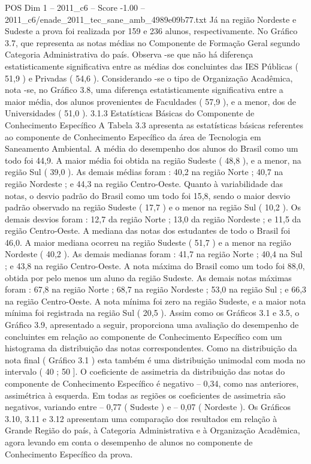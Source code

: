 \begin{textsample}{POS Dim 1 – 2011\_c6 – Score -1.00 – 2011\_c6/enade\_2011\_tec\_sane\_amb\_4989e09b77.txt}
Já na região Nordeste e Sudeste a prova foi realizada por 159 e 236 alunos, respectivamente.
No Gráfico 3.7, que representa as notas médias no Componente de Formação Geral segundo Categoria Administrativa do país.
Observa -se que não há diferença estatisticamente significativa entre as médias dos concluintes das IES Públicas ( 51,9 ) e Privadas ( 54,6 ).
Considerando -se o tipo de Organização Acadêmica, nota -se, no Gráfico 3.8, uma diferença estatisticamente significativa entre a maior média, dos alunos provenientes de Faculdades ( 57,9 ), e a menor, dos de Universidades ( 51,0 ). 3.1.3 Estatísticas Básicas do Componente de Conhecimento Específico A Tabela 3.3 apresenta as estatísticas básicas referentes ao componente de Conhecimento Específico da área de Tecnologia em Saneamento Ambiental.
A média do desempenho dos alunos do Brasil como um todo foi 44,9.
A maior média foi obtida na região Sudeste ( 48,8 ), e a menor, na região Sul ( 39,0 ).
As demais médias foram : 40,2 na região Norte ; 40,7 na região Nordeste ; e 44,3 na região Centro-Oeste.
Quanto à variabilidade das notas, o desvio padrão do Brasil como um todo foi 15,8, sendo o maior desvio padrão observado na região Sudeste ( 17,7 ) e o menor na região Sul ( 10,2 ).
Os demais desvios foram : 12,7 da região Norte ; 13,0 da região Nordeste ; e 11,5 da região Centro-Oeste.
A mediana das notas dos estudantes de todo o Brasil foi 46,0.
A maior mediana ocorreu na região Sudeste ( 51,7 ) e a menor na região Nordeste ( 40,2 ).
As demais medianas foram : 41,7 na região Norte ; 40,4 na Sul ; e 43,8 na região Centro-Oeste.
A nota máxima do Brasil como um todo foi 88,0, obtida por pelo menos um aluno da região Sudeste.
As demais notas máximas foram : 67,8 na região Norte ; 68,7 na região Nordeste ; 53,0 na região Sul ; e 66,3 na região Centro-Oeste.
A nota mínima foi zero na região Sudeste, e a maior nota mínima foi registrada na região Sul ( 20,5 ).
Assim como os Gráficos 3.1 e 3.5, o Gráfico 3.9, apresentado a seguir, proporciona uma avaliação do desempenho de concluintes em relação ao componente de Conhecimento Específico com um histograma da distribuição das notas correspondentes.
Como na distribuição da nota final ( Gráfico 3.1 ) esta também é uma distribuição unimodal com moda no intervalo ( 40 ; 50 ].
O coeficiente de assimetria da distribuição das notas do componente de Conhecimento Específico é negativo – 0,34, como nas anteriores, assimétrica à esquerda.
Em todas as regiões os coeficientes de assimetria são negativos, variando entre – 0,77 ( Sudeste ) e – 0,07 ( Nordeste ).
Os Gráficos 3.10, 3.11 e 3.12 apresentam uma comparação dos resultados em relação à Grande Região do país, à Categoria Administrativa e à Organização Acadêmica, agora levando em conta o desempenho de alunos no componente de Conhecimento Específico da prova.

\end{textsample}
